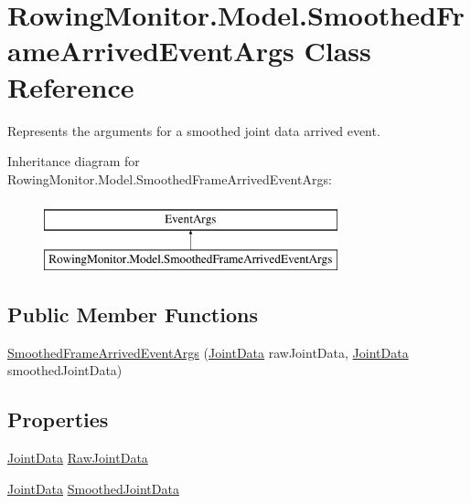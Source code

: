 \hypertarget{class_rowing_monitor_1_1_model_1_1_smoothed_frame_arrived_event_args}{}\section{Rowing\+Monitor.\+Model.\+Smoothed\+Frame\+Arrived\+Event\+Args Class Reference}
\label{class_rowing_monitor_1_1_model_1_1_smoothed_frame_arrived_event_args}


Represents the arguments for a smoothed joint data arrived event.  


Inheritance diagram for Rowing\+Monitor.\+Model.\+Smoothed\+Frame\+Arrived\+Event\+Args\+:\begin{figure}[H]
\begin{center}
\leavevmode
\includegraphics[height=2.000000cm]{class_rowing_monitor_1_1_model_1_1_smoothed_frame_arrived_event_args}
\end{center}
\end{figure}
\subsection*{Public Member Functions}
\begin{DoxyCompactItemize}
\item 
\hyperlink{class_rowing_monitor_1_1_model_1_1_smoothed_frame_arrived_event_args_a923725ca3400f634d0ce4a01c03388e7}{Smoothed\+Frame\+Arrived\+Event\+Args} (\hyperlink{struct_rowing_monitor_1_1_model_1_1_util_1_1_joint_data}{Joint\+Data} raw\+Joint\+Data, \hyperlink{struct_rowing_monitor_1_1_model_1_1_util_1_1_joint_data}{Joint\+Data} smoothed\+Joint\+Data)
\end{DoxyCompactItemize}
\subsection*{Properties}
\begin{DoxyCompactItemize}
\item 
\hyperlink{struct_rowing_monitor_1_1_model_1_1_util_1_1_joint_data}{Joint\+Data} \hyperlink{class_rowing_monitor_1_1_model_1_1_smoothed_frame_arrived_event_args_ae8c8a6d20114b898e9192ed282393178}{Raw\+Joint\+Data}
\item 
\hyperlink{struct_rowing_monitor_1_1_model_1_1_util_1_1_joint_data}{Joint\+Data} \hyperlink{class_rowing_monitor_1_1_model_1_1_smoothed_frame_arrived_event_args_adee9a15912d769914f058a7e984948d6}{Smoothed\+Joint\+Data}
\end{DoxyCompactItemize}


